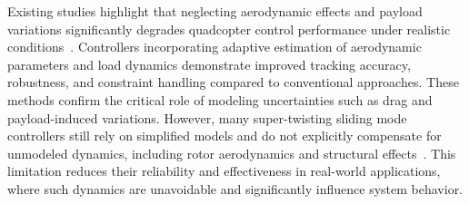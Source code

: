 \noindent Existing studies highlight that neglecting aerodynamic effects and payload variations significantly degrades quadcopter control performance under realistic conditions~\cite{wang2023robust,kashi2025finite,anderson2020constrained}. Controllers incorporating adaptive estimation of aerodynamic parameters and load dynamics demonstrate improved tracking accuracy, robustness, and constraint handling compared to conventional approaches. These methods confirm the critical role of modeling uncertainties such as drag and payload-induced variations. However, many super-twisting sliding mode controllers still rely on simplified models and do not explicitly compensate for unmodeled dynamics, including rotor aerodynamics and structural effects~\cite{labbadi2020novel,gedefaw2024improved}. This limitation reduces their reliability and effectiveness in real-world applications, where such dynamics are unavoidable and significantly influence system behavior.






